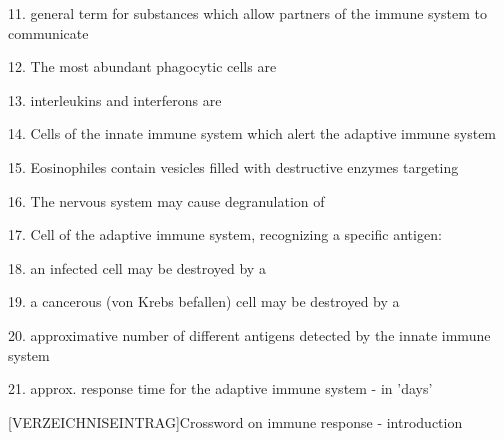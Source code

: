\begin{minipage}{16cm}
\begin{multicols}{2}
			11. general term for substances which allow partners of the immune system to communicate

			12. The most abundant phagocytic cells are

			13. interleukins and interferons are

			14. Cells of the innate immune system which alert the adaptive immune system

			15. Eosinophiles contain vesicles filled with destructive enzymes targeting

			16. The nervous system may cause degranulation of

			17. Cell of the adaptive immune system, recognizing a specific antigen:

			18. an infected cell may be destroyed by a

			19. a cancerous (von Krebs befallen) cell may be destroyed by a

			20. approximative number of different antigens detected by the innate immune system

			21. approx. response time for the adaptive immune system - in 'days'
			 \egroup
	\end{multicols}
	\end{minipage}

%
	 \areaset[0cm]{20cm}{28cm}
	\thispagestyle{empty}
		{
		\begin{minipage}[htbp]{20cm}
		 [VERZEICHNISEINTRAG]{Crossword on immune response - introduction}  	\label{fig:CrissCrossBodyDefense}
		\vspace{2pt}
		\end{minipage}
		}%


